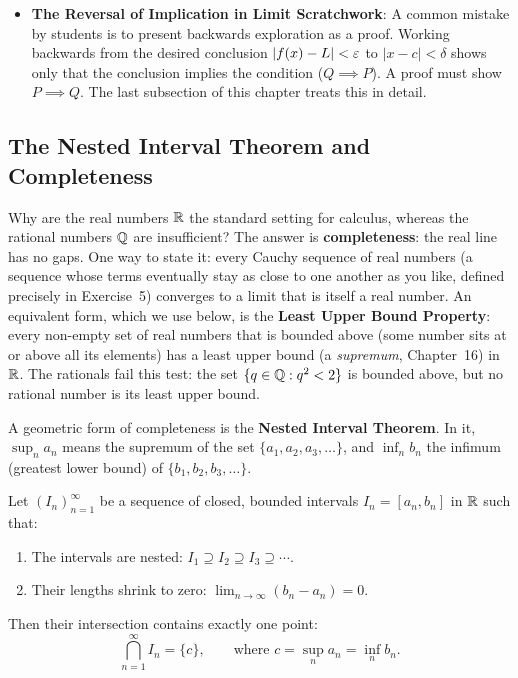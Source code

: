 \begin{itemize}
  Charles Hermite wrote to Thomas Stieltjes: ``I turn away with fright and horror from this lamentable evil of functions which have no derivatives!'' Pictures cannot settle whether such a curve has tangents (a picture can show only finitely many terms); only checking the quantified definitions of continuity and differentiability, point by point, can.
  \item \textbf{The Reversal of Implication in Limit Scratchwork}: A common mistake by students is to present backwards exploration as a proof. Working backwards from the desired conclusion $|f(x) - L| < \varepsilon$ to $|x - c| < \delta$ shows only that the conclusion implies the condition ($Q \implies P$). A proof must show $P \implies Q$. The last subsection of this chapter treats this in detail.
\end{itemize}

\subsection{The Nested Interval Theorem and Completeness}

Why are the real numbers $\mathbb{R}$ the standard setting for calculus, whereas the rational numbers $\mathbb{Q}$ are insufficient? The answer is \textbf{completeness}: the real line has no gaps. One way to state it: every Cauchy sequence of real numbers (a sequence whose terms eventually stay as close to one another as you like, defined precisely in Exercise~5) converges to a limit that is itself a real number. An equivalent form, which we use below, is the \textbf{Least Upper Bound Property}: every non-empty set of real numbers that is bounded above (some number sits at or above all its elements) has a least upper bound (a \emph{supremum}, Chapter~16) in $\mathbb{R}$. The rationals fail this test: the set $\{q \in \mathbb{Q} : q^2 < 2\}$ is bounded above, but no rational number is its least upper bound.

A geometric form of completeness is the \textbf{Nested Interval Theorem}. In it, $\sup_n a_n$ means the supremum of the set $\{a_1, a_2, a_3, \dots\}$, and $\inf_n b_n$ the infimum (greatest lower bound) of $\{b_1, b_2, b_3, \dots\}$.

\begin{theorem}
Let $(I_n)_{n=1}^\infty$ be a sequence of closed, bounded intervals $I_n = [a_n, b_n]$ in $\mathbb{R}$ such that:
\begin{enumerate}
  \item The intervals are nested: $I_1 \supseteq I_2 \supseteq I_3 \supseteq \cdots$.
  \item Their lengths shrink to zero: $\lim_{n \to \infty} (b_n - a_n) = 0$.
\end{enumerate}
Then their intersection contains exactly one point:
\[
\bigcap_{n=1}^\infty I_n = \{c\}, \qquad \text{where } c = \sup_{n} a_n = \inf_{n} b_n.
\]
\end{theorem}

